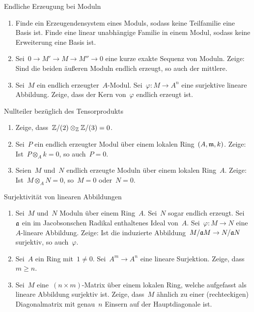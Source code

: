 \documentclass[entwurf]{uebblatt}
\begin{document}

\begin{aufgabe}{}{Endliche Erzeugung bei Moduln}
\begin{enumerate}
\item Finde ein Erzeugendensystem eines Moduls, sodass keine Teilfamilie eine
Basis ist. Finde eine linear unabhängige Familie in einem Modul, sodass keine
Erweiterung eine Basis ist.
\item Sei~$0 \to M' \to M \to M'' \to 0$ eine kurze exakte Sequenz von Moduln.
Zeige: Sind die beiden äußeren Moduln endlich erzeugt, so auch der mittlere.
\item Sei~$M$ ein endlich erzeugter~$A$-Modul. Sei~$\varphi : M \to A^n$ eine
surjektive lineare Abbildung. Zeige, dass der Kern von~$\varphi$ endlich
erzeugt ist.
\end{enumerate}
\end{aufgabe}

\begin{aufgabe}{}{Nullteiler bezüglich des Tensorprodukts}
\begin{enumerate}
\item Zeige, dass~$\mathbb{Z}/(2) \otimes_{\mathbb{Z}} \mathbb{Z}/(3) = 0$.
\item Sei~$P$ ein endlich erzeugter Modul über einem lokalen Ring~$(A,\mathfrak{m},k)$.
Zeige: Ist~$P \otimes_A k = 0$, so auch~$P = 0$.
\item Seien~$M$ und~$N$ endlich erzeugte Moduln über einem lokalen Ring~$A$.
Zeige: Ist~$M \otimes_A N = 0$, so~$M = 0$ oder~$N = 0$.
\end{enumerate}
\end{aufgabe}

\begin{aufgabe}{}{Surjektivität von linearen Abbildungen}
\begin{enumerate}
\item Sei~$M$ und~$N$ Moduln über einem Ring~$A$. Sei~$N$ sogar endlich
erzeugt. Sei~$\mathfrak{a}$ ein im Jacobsonschen Radikal enthaltenes Ideal von~$A$.
Sei~$\varphi : M \to N$ eine~$A$-lineare Abbildung. Zeige: Ist die
induzierte Abbildung~$M/\mathfrak{a} M \to N/\mathfrak{a} N$ surjektiv, so auch~$\varphi$.
\item Sei~$A$ ein Ring mit~$1 \neq 0$. Sei~$A^m \to A^n$ eine lineare
Surjektion. Zeige, dass~$m \geq n$.
\item Sei~$M$ eine~$(n \times m)$-Matrix über einem lokalen Ring, welche
aufgefasst als lineare Abbildung surjektiv ist. Zeige, dass~$M$ ähnlich zu einer
(rechteckigen) Diagonalmatrix mit genau~$n$ Einsern auf der Hauptdiagonale ist.
\end{enumerate}
\end{aufgabe}
\end{document}
